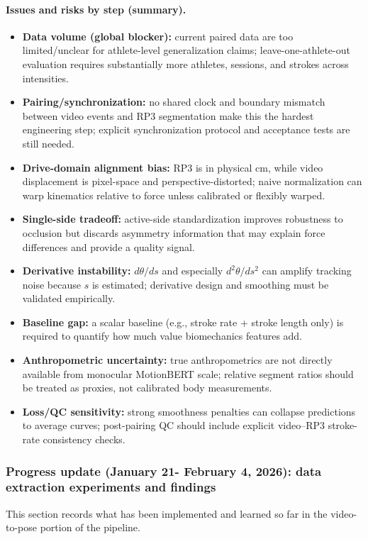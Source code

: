 \documentclass[11pt]{article}
\begin{document}
\paragraph{Issues and risks by step (summary).}
\begin{itemize}
	\item \textbf{Data volume (global blocker):} current paired data are too limited/unclear for athlete-level generalization claims; leave-one-athlete-out evaluation requires substantially more athletes, sessions, and strokes across intensities.
	\item \textbf{Pairing/synchronization:} no shared clock and boundary mismatch between video events and RP3 segmentation make this the hardest engineering step; explicit synchronization protocol and acceptance tests are still needed.
	\item \textbf{Drive-domain alignment bias:} RP3 is in physical cm, while video displacement is pixel-space and perspective-distorted; naive normalization can warp kinematics relative to force unless calibrated or flexibly warped.
	\item \textbf{Single-side tradeoff:} active-side standardization improves robustness to occlusion but discards asymmetry information that may explain force differences and provide a quality signal.
	\item \textbf{Derivative instability:} $d\theta/ds$ and especially $d^2\theta/ds^2$ can amplify tracking noise because $s$ is estimated; derivative design and smoothing must be validated empirically.
	\item \textbf{Baseline gap:} a scalar baseline (e.g., stroke rate + stroke length only) is required to quantify how much value biomechanics features add.
	\item \textbf{Anthropometric uncertainty:} true anthropometrics are not directly available from monocular MotionBERT scale; relative segment ratios should be treated as proxies, not calibrated body measurements.
	\item \textbf{Loss/QC sensitivity:} strong smoothness penalties can collapse predictions to average curves; post-pairing QC should include explicit video--RP3 stroke-rate consistency checks.
\end{itemize}


\subsubsection*{Progress update (January 21- February 4, 2026): data extraction experiments and findings}
This section records what has been implemented and learned so far in the video-to-pose portion of the pipeline.
\end{document}
